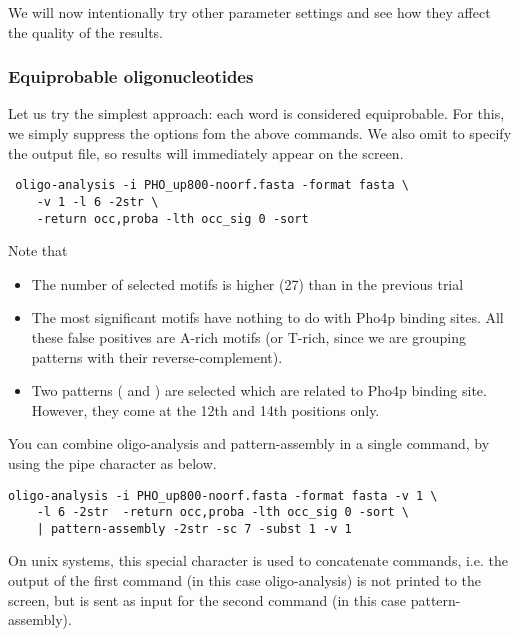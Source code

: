 We will now intentionally try other parameter settings and see how
they affect the quality of the results.

\subsubsection{Equiprobable oligonucleotides}

Let us try the simplest approach: each word is considered
equiprobable. For this, we simply suppress the options  fom the above commands. We
also omit to specify the output file, so results will immediately
appear on the screen.

{\color{Blue} \begin{footnotesize} 
\begin{verbatim}
 oligo-analysis -i PHO_up800-noorf.fasta -format fasta \ 
    -v 1 -l 6 -2str \
    -return occ,proba -lth occ_sig 0 -sort 
\end{verbatim} \end{footnotesize}
}


Note that
\begin{itemize} 
\item The number of selected motifs is higher (27) than in the previous trial
\item The most significant motifs have nothing to do with Pho4p binding
sites. All these false positives are A-rich motifs (or T-rich, since we
are grouping patterns with their reverse-complement).
\item Two patterns (\seq{acgttt} and \seq{acgtgc}) are selected
which are related to Pho4p binding site. However, they come at the
12th and 14th positions only.
\end{itemize}

You can combine oligo-analysis and pattern-assembly in a single
command, by using the pipe character as below.

{\color{Blue} \begin{footnotesize} 
\begin{verbatim}
oligo-analysis -i PHO_up800-noorf.fasta -format fasta -v 1 \
    -l 6 -2str  -return occ,proba -lth occ_sig 0 -sort \
    | pattern-assembly -2str -sc 7 -subst 1 -v 1 
\end{verbatim} \end{footnotesize}
}


On unix systems, this special character is used to concatenate
commands, i.e. the output of the first command (in this case
oligo-analysis) is not printed to the screen, but is sent as input for
the second command (in this case pattern-assembly).

